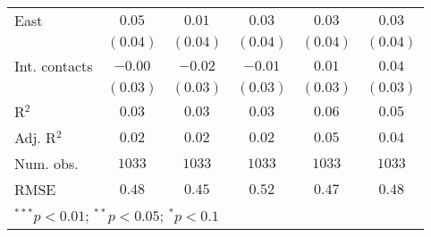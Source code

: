 \begin{table}
\begin{center}
\begin{small}
\begin{tabular}{l c c c c c}
East          & $0.05$        & $0.01$        & $0.03$        & $0.03$       & $0.03$        \\
              & $(0.04)$      & $(0.04)$      & $(0.04)$      & $(0.04)$     & $(0.04)$      \\
Int. contacts & $-0.00$       & $-0.02$       & $-0.01$       & $0.01$       & $0.04$        \\
              & $(0.03)$      & $(0.03)$      & $(0.03)$      & $(0.03)$     & $(0.03)$      \\
\midrule
R$^2$         & $0.03$        & $0.03$        & $0.03$        & $0.06$       & $0.05$        \\
Adj. R$^2$    & $0.02$        & $0.02$        & $0.02$        & $0.05$       & $0.04$        \\
Num. obs.     & $1033$        & $1033$        & $1033$        & $1033$       & $1033$        \\
RMSE          & $0.48$        & $0.45$        & $0.52$        & $0.47$       & $0.48$        \\
\bottomrule
\multicolumn{6}{l}{\tiny{$^{***}p<0.01$; $^{**}p<0.05$; $^{*}p<0.1$}}
\end{tabular}
\end{small}
\label{tab_host_mhealth}
\end{center}
\end{table}
